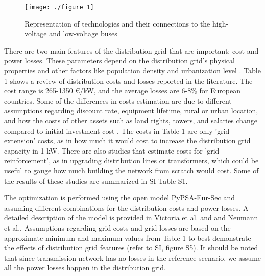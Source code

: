 \documentclass[review]{elsarticle}
\begin{document}
	\begin{figure}[!htb]
		\texttt{[image: ./figure 1]}
		\caption{\textbf{} Representation of technologies and their connections to the high-voltage and low-voltage buses}
		\label{fig:pypsa}
	\end{figure}
	
	There are two main features of the distribution grid that are important: cost and power losses. These parameters depend on the distribution grid's physical properties and other factors like population density and urbanization level \cite{sadovskaia_2019}. Table 1 shows a review of distribution costs and losses reported in the literature. The cost range is 265-1350 €/kW, and the average losses are 6-8\% for European countries. Some of the differences in costs estimation are due to different assumptions regarding discount rate, equipment lifetime, rural or urban location, and how the costs of other assets such as land rights, towers, and salaries change compared to initial investment cost \cite{gupta_2021,rauschkolb_2021}. The costs in Table 1 are only 'grid extension' costs, as in how much it would cost to increase the distribution grid capacity in 1 kW. There are also studies that estimate costs for 'grid reinforcement', as in upgrading distribution lines or transformers, which could be useful to gauge how much building the network from scratch would cost. Some of the results of these studies are summarized in SI Table S1. 
	
	The optimization is performed using the open model PyPSA-Eur-Sec and assuming different combinations for the distribution costs and power losses. A detailed description of the model is provided in Victoria et al.\cite{victoria_2022} and and Neumann et al.\cite{neumann2023potential}. Assumptions regarding grid costs and grid losses are based on the approximate minimum and maximum values from Table 1 to best demonstrate the effects of distribution grid features (refer to SI, figure S5). It should be noted that since transmission network has no losses in the reference scenario, we assume all the power losses happen in the distribution grid.
	
\end{document}
